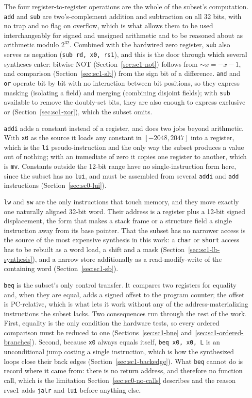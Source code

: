 The four register-to-register operations are the whole of the subset's computation. \texttt{add} and
\texttt{sub} are two's-complement addition and subtraction on all 32 bits, with no trap and no flag
on overflow, which is what allows them to be used interchangeably for signed and unsigned arithmetic
and to be reasoned about as arithmetic modulo $2^{32}$. Combined with the hardwired zero register,
\texttt{sub} also serves as negation (\texttt{sub rd, x0, rs1}), and this is the door through which
several syntheses enter: bitwise NOT (Section~\ref{sec:sc1-not}) follows from
$\mathord{\sim}x = -x - 1$, and comparison (Section~\ref{sec:sc1-slt}) from the sign bit of a
difference. \texttt{and} and \texttt{or} operate bit by bit with no interaction between bit
positions, so they express masking (isolating a field) and merging (combining disjoint fields); with
\texttt{sub} available to remove the doubly-set bits, they are also enough to express exclusive or
(Section~\ref{sec:sc1-xor}), which the subset omits.

\texttt{addi} adds a constant instead of a register, and does two jobs beyond arithmetic. With
\texttt{x0} as the source it loads any constant in $[-2048, 2047]$ into a register, which is the
\texttt{li} pseudo-instruction and the only way the subset produces a value out of nothing; with an
immediate of zero it copies one register to another, which is \texttt{mv}. Constants outside the
12-bit range have no single-instruction form here, since the subset has no \texttt{lui}, and must be
assembled from several \texttt{addi} and \texttt{add} instructions (Section~\ref{sec:sc0-lui}).

\texttt{lw} and \texttt{sw} are the only instructions that touch memory, and they move exactly one
naturally aligned 32-bit word. Their address is a register plus a 12-bit signed displacement, the
form that makes a stack frame or a structure field a single instruction away from its base pointer.
That the subset has no narrower access is the source of the most expensive synthesis in this work:
a \texttt{char} or \texttt{short} access has to be rebuilt as a word load, a shift and a mask
(Section~\ref{sec:sc1-lb-synthesis}), and a narrow store additionally as a read-modify-write of the
containing word (Section~\ref{sec:sc1-sb}).

\texttt{beq} is the subset's only control transfer. It compares two registers for equality and, when
they are equal, adds a signed offset to the program counter; the offset is PC-relative, which is what
lets it work without any of the address-materializing instructions the subset lacks. Two consequences
run through the rest of the work. First, equality is the only condition the hardware tests, so every
ordered comparison must be reduced to one (Sections~\ref{sec:sc1-bne}
and~\ref{sec:sc1-ordered-branches}). Second, because \texttt{x0} always equals itself,
\texttt{beq x0, x0, L} is an unconditional jump costing a single instruction, which is how the
synthesized loops close their back edges (Section~\ref{sec:sc1-backedge}). What \texttt{beq} cannot
do is record where it came from: there is no return address, and therefore no function call, which is
the limitation Section~\ref{sec:sc0-no-calls} describes and the reason rvsc1 adds \texttt{jalr} and
\texttt{lui} before anything else.

